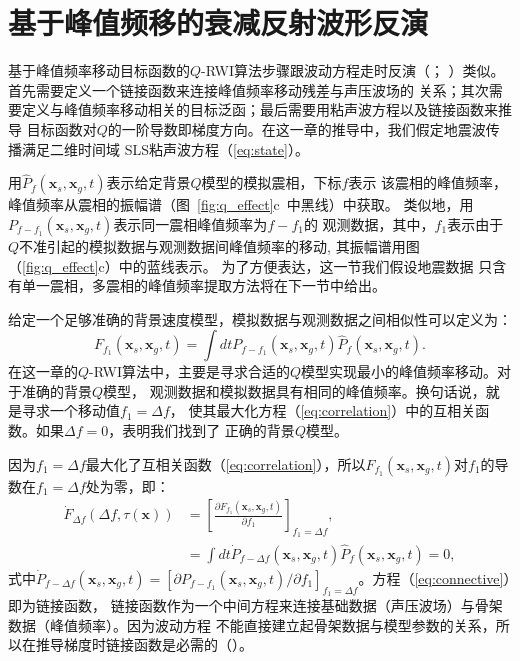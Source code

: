 \newpage
\vspace{1.5cm}
\section{基于峰值频移的衰减反射波形反演}

基于峰值频率移动目标函数的$Q$-RWI算法步骤跟波动方程走时反演（；
）类似。首先需要定义一个链接函数来连接峰值频率移动残差与声压波场的
关系；其次需要定义与峰值频率移动相关的目标泛函；最后需要用粘声波方程以及链接函数来推导
目标函数对$Q$的一阶导数即梯度方向。在这一章的推导中，我们假定地震波传播满足二维时间域
SLS粘声波方程（\ref{eq:state}）。

用$\hat{P}_f(\mathbf{x}_s,\mathbf{x}_g,t)$表示给定背景$Q$模型的模拟震相，下标$f$表示
该震相的峰值频率，峰值频率从震相的振幅谱（图~\ref{fig:q_effect}c~中黑线）中获取。
类似地，用$P_{f-f_1}(\mathbf{x}_s,\mathbf{x}_g,t)$表示同一震相峰值频率为$f-f_1$的
观测数据，其中，$f_1$表示由于 
$Q$不准引起的模拟数据与观测数据间峰值频率的移动,
其振幅谱用图（\ref{fig:q_effect}c）中的蓝线表示。
为了方便表达，这一节我们假设地震数据
只含有单一震相，多震相的峰值频率提取方法将在下一节中给出。

给定一个足够准确的背景速度模型，模拟数据与观测数据之间相似性可以定义为：
\begin{equation}
	F_{f_1}(\mathbf{x}_s,\mathbf{x}_g,t)=\int dt P_{f-f_1}(\mathbf{x}_s,\mathbf{x}_g,t) 
	\hat{P}_f(\mathbf{x}_s,\mathbf{x}_g,t).
	\label{eq:correlation}
\end{equation}
在这一章的$Q$-RWI算法中，主要是寻求合适的$Q$模型实现最小的峰值频率移动。对于准确的背景$Q$模型，
观测数据和模拟数据具有相同的峰值频率。换句话说，就是寻求一个移动值$f_1=\Delta f$，
使其最大化方程（\ref{eq:correlation}）中的互相关函数。如果$\Delta f=0$，表明我们找到了
正确的背景$Q$模型。

因为$f_1=\Delta f$最大化了互相关函数（\ref{eq:correlation}），所以$F_{f_1}(\mathbf{x}_s,
\mathbf{x}_g,t)$对$f_1$的导数在$f_1=\Delta f$处为零，即：
\begin{equation}
	\begin{aligned}
		\dot{F}_{\Delta f}(\Delta f,\tau(\mathbf{x})) &=\left[\frac{\partial F_{f_1}
	(\mathbf{x}_s,\mathbf{x}_g,t)}{\partial f_1}\right]_{f_1=\Delta f}, \\
		&= \int dt \dot{P}_{f-\Delta f}(\mathbf{x}_s,\mathbf{x}_g,t)
	\hat{P}_f(\mathbf{x}_s,\mathbf{x}_g,t)=0,
	\label{eq:connective}
	\end{aligned}
\end{equation}
式中$\dot{P}_{f-\Delta f}(\mathbf{x}_s,\mathbf{x}_g,t)=[\partial P_{f-f_1}(\mathbf{x}_s,
\mathbf{x}_g,t)/\partial f_1]_{f_1=\Delta f}$。方程（\ref{eq:connective}）即为链接函数，
链接函数作为一个中间方程来连接基础数据（声压波场）与骨架数据（峰值频率）。因为波动方程
不能直接建立起骨架数据与模型参数的关系，所以在推导梯度时链接函数是必需的（）。

